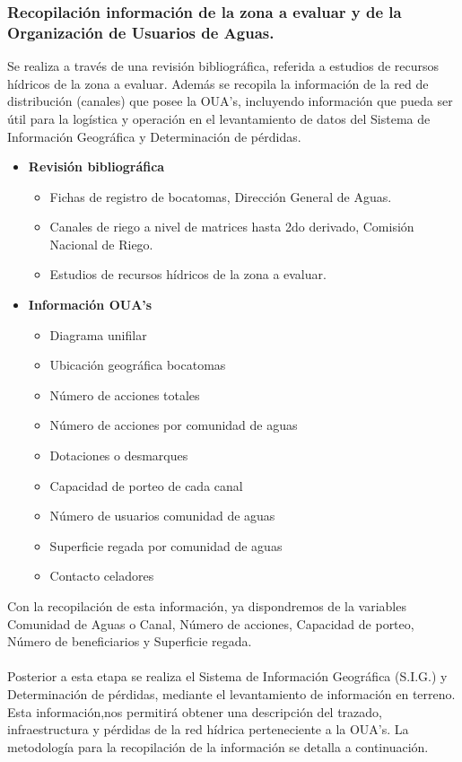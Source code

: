 \documentclass[]{article}
\begin{document}
\subsubsection{Recopilación información de la zona a evaluar y de la Organización de Usuarios de Aguas.}

Se realiza a través de una revisión bibliográfica, referida a estudios de recursos hídricos de la zona a evaluar. Además se recopila la información de la red de distribución (canales) que posee la OUA's, incluyendo información que pueda ser útil para la logística y operación en el levantamiento de datos del Sistema de Información Geográfica y Determinación de pérdidas.

\begin{itemize}
	\item \textbf{Revisión bibliográfica}
	\begin{itemize}	
		\item Fichas de registro de bocatomas, Dirección General de Aguas.
		\item Canales de riego a nivel de matrices hasta 2do derivado, Comisión Nacional de Riego.
		\item Estudios de recursos hídricos de la zona a evaluar.
	\end{itemize}
	\item \textbf{Información OUA's}
	\begin{itemize}	
		\item Diagrama unifilar
		\item Ubicación geográfica bocatomas
		\item Número de acciones totales
		\item Número de acciones por comunidad de aguas
		\item Dotaciones o desmarques
		\item Capacidad de porteo de cada canal
		\item Número de usuarios comunidad de aguas
		\item Superficie regada por comunidad de aguas
		\item Contacto celadores
	\end{itemize}
\end{itemize}	

Con la recopilación de esta información, ya dispondremos de la variables Comunidad de Aguas o Canal, Número de acciones, Capacidad de porteo, Número de beneficiarios y Superficie regada.\\
\\
Posterior a esta etapa se realiza el Sistema de Información Geográfica (S.I.G.) y Determinación de pérdidas, mediante el levantamiento de información en terreno. Esta información,nos permitirá obtener una descripción del trazado, infraestructura y pérdidas de la red hídrica perteneciente a la OUA's. La metodología para la recopilación de la información se detalla a continuación.
\end{document}
